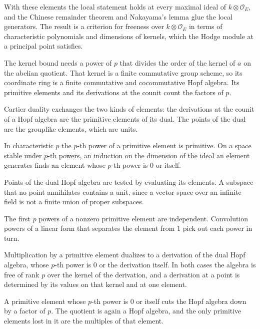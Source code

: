 With these elements the local statement holds at every maximal ideal of $k\otimes\mathcal O_E$, and the
Chinese remainder theorem and Nakayama's lemma glue the local generators. The result is a criterion for
freeness over $k\otimes\mathcal O_E$ in terms of characteristic polynomials and dimensions of kernels,
which the Hodge module at a principal point satisfies.

The kernel bound needs a power of $p$ that divides the order of the kernel of $a$ on the abelian
quotient. That kernel is a finite commutative group scheme, so its coordinate ring is a finite
commutative and cocommutative Hopf algebra. Its primitive elements and its derivations at the counit
count the factors of $p$.

Cartier duality exchanges the two kinds of elements: the derivations at the counit of a Hopf algebra are
the primitive elements of its dual. The points of the dual are the grouplike elements, which are units.

In characteristic $p$ the $p$-th power of a primitive element is primitive. On a space stable under
$p$-th powers, an induction on the dimension of the ideal an element generates finds an element whose
$p$-th power is $0$ or itself.

Points of the dual Hopf algebra are tested by evaluating its elements. A subspace that no point
annihilates contains a unit, since a vector space over an infinite field is not a finite union of proper
subspaces.

The first $p$ powers of a nonzero primitive element are independent. Convolution powers of a linear form
that separates the element from $1$ pick out each power in turn.

Multiplication by a primitive element dualizes to a derivation of the dual Hopf algebra, whose $p$-th power
is $0$ or the derivation itself. In both cases the algebra is free of rank $p$ over the kernel of the
derivation, and a derivation at a point is determined by its values on that kernel and at one element.

A primitive element whose $p$-th power is $0$ or itself cuts the Hopf algebra down by a factor of $p$.
The quotient is again a Hopf algebra, and the only primitive elements lost in it are the multiples of
that element.

